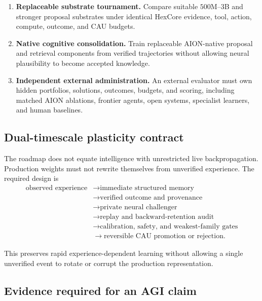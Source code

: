\begin{enumerate}
  \item \textbf{Replaceable substrate tournament.} Compare suitable
        $500$M--$3$B and stronger proposal substrates under identical HexCore
        evidence, tool, action, compute, outcome, and CAU budgets.

  \item \textbf{Native cognitive consolidation.} Train replaceable AION-native
        proposal and retrieval components from verified trajectories without
        allowing neural plausibility to become accepted knowledge.

  \item \textbf{Independent external administration.} An external evaluator
        must own hidden portfolios, solutions, outcomes, budgets, and scoring,
        including matched AION ablations, frontier agents, open systems,
        specialist learners, and human baselines.
\end{enumerate}


\subsection{Dual-timescale plasticity contract}
\label{subsec:dual-timescale-plasticity}

The roadmap does not equate intelligence with unrestricted live
backpropagation.  Production weights must not rewrite themselves from
unverified experience.  The required design is
\begin{equation}
\begin{split}
\text{observed experience}
&\rightarrow \text{immediate structured memory} \\
&\rightarrow \text{verified outcome and provenance} \\
&\rightarrow \text{private neural challenger} \\
&\rightarrow \text{replay and backward-retention audit} \\
&\rightarrow \text{calibration, safety, and weakest-family gates} \\
&\rightarrow \text{reversible CAU promotion or rejection}.
\end{split}
\label{eq:dual-timescale-plasticity}
\end{equation}

This preserves rapid experience-dependent learning without allowing a single
unverified event to rotate or corrupt the production representation.


\subsection{Evidence required for an AGI claim}
\label{subsec:agi-evidence-gates}

